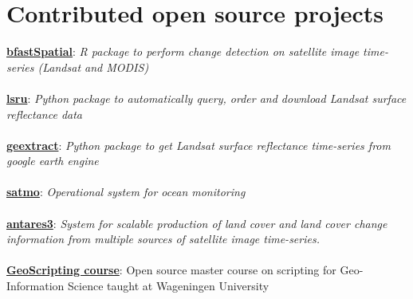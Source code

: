 \documentclass[]{friggeri-cv}
\begin{document}
\section{Contributed open source projects}
    \href{https://github.com/loicdtx/bfastspatial}{\textbf{bfastSpatial}}: \textit{R package to perform change detection on satellite image time-series (Landsat and MODIS)}\\
    \\
    \href{https://github.com/loicdtx/lsru}{\textbf{lsru}}: \textit{Python package to automatically query, order and download Landsat surface reflectance data}\\
    \\
    \href{https://github.com/loicdtx/landsat-extract-gee}{\textbf{geextract}}: \textit{Python package to get Landsat surface reflectance time-series from google earth engine}\\
    \\
    \href{https://github.com/CONABIO/satmo}{\textbf{satmo}}: \textit{Operational system for ocean monitoring}\\
    \\
    \href{https://github.com/CONABIO/antares3}{\textbf{antares3}}: \textit{System for scalable production of land cover and land cover change information from multiple sources of satellite image time-series.}\\
    \\
    \href{http://geoscripting-wur.github.io/}{\textbf{GeoScripting course}}: Open source master course on scripting for Geo-Information Science taught at Wageningen University\\
\end{document}

